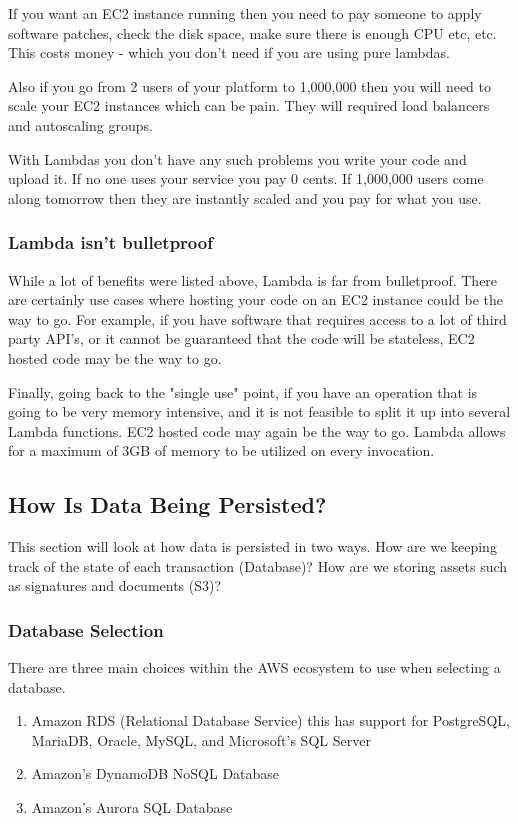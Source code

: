 \documentclass[runningheads]{llncs}
\begin{document}
If you want an EC2 instance running then you need to pay someone to apply software patches, check the disk space, make sure there is enough CPU etc, etc.  This costs money - which you don't need if you are using pure lambdas.

Also if you go from 2 users of your platform to 1,000,000 then you will need to scale your EC2 instances which can be pain.  They will required load balancers and autoscaling groups.

With Lambdas you don't have any such problems you write your code and upload it. If no one uses your service you pay 0 cents. If 1,000,000 users come along tomorrow then they are instantly scaled and you pay for what you use.

\subsubsection{Lambda isn't bulletproof}
While a lot of benefits were listed above, Lambda is far from bulletproof. There are certainly use cases where hosting your code on an EC2 instance could be the way to go. For example, if you have software that requires access to a lot of third party API's, or it cannot be guaranteed that the code will be stateless, EC2 hosted code may be the way to go. 

Finally, going back to the "single use" point, if you have an operation that is going to be very memory intensive, and it is not feasible to split it up into several Lambda functions. EC2 hosted code may again be the way to go. Lambda allows for a maximum of 3GB of memory to be utilized on every invocation.

\subsection{How Is Data Being Persisted?}
This section will look at how data is persisted in two ways. How are we keeping track of the state of each transaction (Database)? How are we storing assets such as signatures and documents (S3)?

\subsubsection{Database Selection}
There are three main choices within the AWS ecosystem to use when selecting a database.
\begin{enumerate}
	\item Amazon RDS (Relational Database Service) this has support for PostgreSQL, MariaDB, Oracle, MySQL, and Microsoft's SQL Server
	\item Amazon's DynamoDB NoSQL Database
	\item Amazon's Aurora SQL Database
\end{enumerate}
\end{document}
